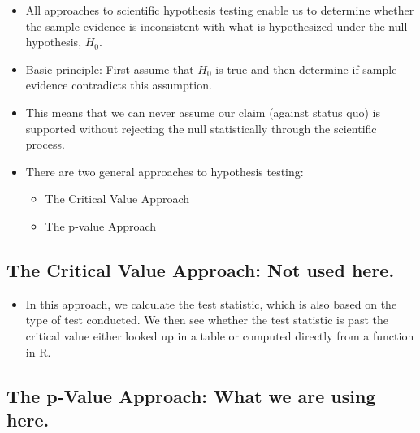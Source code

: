 \documentclass[
  letterpaper,
  DIV=11,
  numbers=noendperiod]{scrreprt}
\providecommand{\tightlist}{%
  \setlength{\itemsep}{0pt}\setlength{\parskip}{0pt}}\usepackage{longtable,booktabs,array}
\begin{document}
\begin{itemize}
\item
  All approaches to scientific hypothesis testing enable us to determine
  whether the sample evidence is inconsistent with what is hypothesized
  under the null hypothesis, \(H_0\).
\item
  Basic principle: First assume that \(H_0\) is true and then determine
  if sample evidence contradicts this assumption.
\item
  This means that we can never assume our claim (against status quo) is
  supported without rejecting the null statistically through the
  scientific process.
\item
  There are two general approaches to hypothesis testing:

  \begin{itemize}
  \tightlist
  \item
    The Critical Value Approach
  \item
    The p-value Approach
  \end{itemize}
\end{itemize}

\subsection{The Critical Value Approach: Not used
here.}\label{the-critical-value-approach-not-used-here.}

\begin{itemize}
\tightlist
\item
  In this approach, we calculate the test statistic, which is also based
  on the type of test conducted. We then see whether the test statistic
  is past the critical value either looked up in a table or computed
  directly from a function in R.
\end{itemize}

\subsection{The p-Value Approach: What we are using
here.}\label{the-p-value-approach-what-we-are-using-here.}
\end{document}
